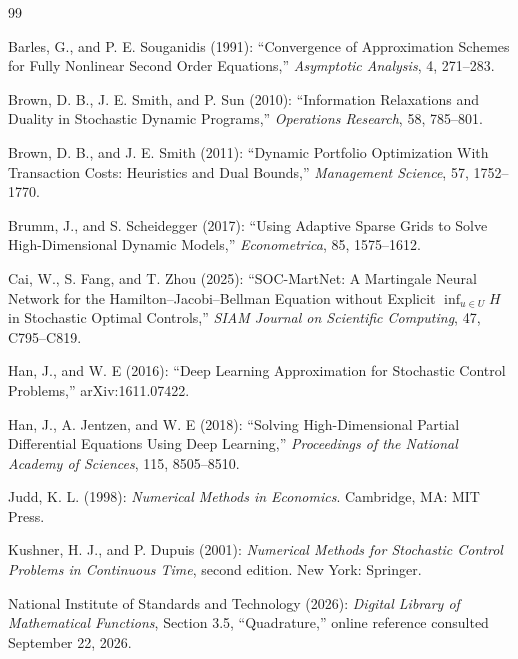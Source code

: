 \begin{thebibliography}{99}

Barles, G., and P. E. Souganidis (1991): ``Convergence of Approximation Schemes for Fully Nonlinear Second Order Equations,'' \emph{Asymptotic Analysis}, 4, 271--283.

Brown, D. B., J. E. Smith, and P. Sun (2010): ``Information Relaxations and Duality in Stochastic Dynamic Programs,'' \emph{Operations Research}, 58, 785--801.

Brown, D. B., and J. E. Smith (2011): ``Dynamic Portfolio Optimization With Transaction Costs: Heuristics and Dual Bounds,'' \emph{Management Science}, 57, 1752--1770.

Brumm, J., and S. Scheidegger (2017): ``Using Adaptive Sparse Grids to Solve High-Dimensional Dynamic Models,'' \emph{Econometrica}, 85, 1575--1612.

Cai, W., S. Fang, and T. Zhou (2025): ``SOC-MartNet: A Martingale Neural Network for the Hamilton--Jacobi--Bellman Equation without Explicit $\inf_{u\in U}H$ in Stochastic Optimal Controls,'' \emph{SIAM Journal on Scientific Computing}, 47, C795--C819.

Han, J., and W. E (2016): ``Deep Learning Approximation for Stochastic Control Problems,'' arXiv:1611.07422.

Han, J., A. Jentzen, and W. E (2018): ``Solving High-Dimensional Partial Differential Equations Using Deep Learning,'' \emph{Proceedings of the National Academy of Sciences}, 115, 8505--8510.

Judd, K. L. (1998): \emph{Numerical Methods in Economics}. Cambridge, MA: MIT Press.

Kushner, H. J., and P. Dupuis (2001): \emph{Numerical Methods for Stochastic Control Problems in Continuous Time}, second edition. New York: Springer.

National Institute of Standards and Technology (2026): \emph{Digital Library of Mathematical Functions}, Section 3.5, ``Quadrature,'' online reference consulted September 22, 2026.

\end{thebibliography}
